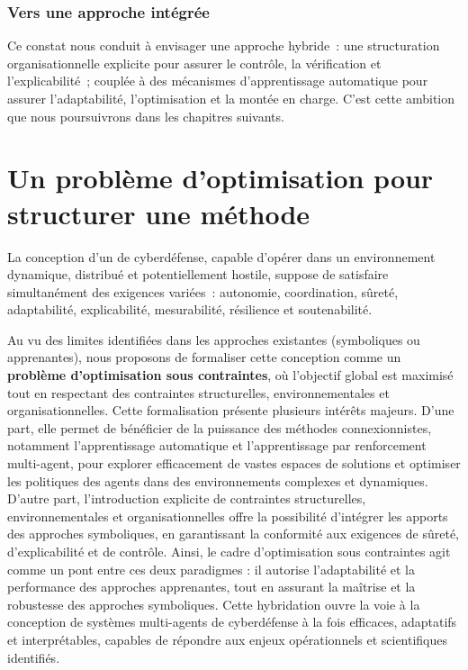 \subsection*{Vers une approche intégrée}

Ce constat nous conduit à envisager une approche hybride~: une structuration organisationnelle explicite pour assurer le contrôle, la vérification et l'explicabilité~; couplée à des mécanismes d'apprentissage automatique pour assurer l'adaptabilité, l'optimisation et la montée en charge. C'est cette ambition que nous poursuivrons dans les chapitres suivants.


\clearpage
\thispagestyle{empty}
\null
\newpage

\chapter{Un problème d'optimisation pour structurer une méthode}
\label{chap:hypotheses}

La conception d’un  de cyberdéfense, capable d’opérer dans un environnement dynamique, distribué et potentiellement hostile, suppose de satisfaire simultanément des exigences variées~: autonomie, coordination, sûreté, adaptabilité, explicabilité, mesurabilité, résilience et soutenabilité.

Au vu des limites identifiées dans les approches existantes (symboliques ou apprenantes), nous proposons de formaliser cette conception comme un \textbf{problème d’optimisation sous contraintes}, où l’objectif global est maximisé tout en respectant des contraintes structurelles, environnementales et organisationnelles.
Cette formalisation présente plusieurs intérêts majeurs. D'une part, elle permet de bénéficier de la puissance des méthodes connexionnistes, notamment l'apprentissage automatique et l'apprentissage par renforcement multi-agent, pour explorer efficacement de vastes espaces de solutions et optimiser les politiques des agents dans des environnements complexes et dynamiques. D'autre part, l'introduction explicite de contraintes structurelles, environnementales et organisationnelles offre la possibilité d'intégrer les apports des approches symboliques, en garantissant la conformité aux exigences de sûreté, d'explicabilité et de contrôle. Ainsi, le cadre d'optimisation sous contraintes agit comme un pont entre ces deux paradigmes : il autorise l'adaptabilité et la performance des approches apprenantes, tout en assurant la maîtrise et la robustesse des approches symboliques. Cette hybridation ouvre la voie à la conception de systèmes multi-agents de cyberdéfense à la fois efficaces, adaptatifs et interprétables, capables de répondre aux enjeux opérationnels et scientifiques identifiés.

